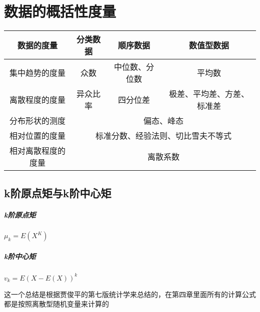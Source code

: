 \documentclass[UTF8,10pt]{book}
\begin{document}

\clearpage
\chapter{数据的概括性度量}


	\begin{tabular}{|c|c|c|c|}%
		\hline  %
		数据的度量&分类数据&顺序数据&数值型数据 \\
		\hline  %
		集中趋势的度量&众数& 中位数、分位数&平均数 \\
		\hline %
		离散程度的度量& 异众比率&四分位差&极差、平均差、方差、标准差 \\
		\hline
		分布形状的测度& \multicolumn{3}{|c|}{偏态、峰态} \\
		\hline
		\hline
		\hline
		相对位置的度量 & \multicolumn{3}{|c|}{标准分数、经验法则、切比雪夫不等式} \\
		
		相对离散程度的度量 & \multicolumn{3}{|c|}{离散系数} \\
		\hline
	\end{tabular}
	
    \section{k阶原点矩与k阶中心矩}
        \paragraph{k阶原点矩} $ \mu_k = E(X^K) $
        \paragraph{k阶中心矩} $ v_k = E(X-E(X))^k $

        {\kaishu 这一个总结是根据贾俊平的第七版统计学来总结的，在第四章里面所有的计算公式都是按照离散型随机变量来计算的}
\end{document}
